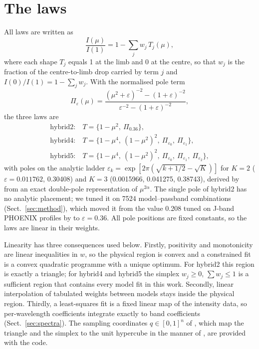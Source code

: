 \documentclass{aa}
\begin{document}
\section{The laws}\label{sec:laws}
All laws are written as
\begin{equation}
\frac{I(\mu)}{I(1)}=1-\sum_j w_j\,T_j(\mu),
\end{equation}
where each shape $T_j$ equals 1 at the limb and 0 at the centre, so that $w_j$
is the fraction of the centre-to-limb drop carried by term $j$ and
$I(0)/I(1)=1-\sum_j w_j$. With the normalised pole term
\begin{equation}
\Pi_\varepsilon(\mu)=\frac{(\mu^2+\varepsilon)^{-2}-(1+\varepsilon)^{-2}}{\varepsilon^{-2}-(1+\varepsilon)^{-2}},
\end{equation}
the three laws are
\begin{align}
\text{hybrid2:}\ & T=\{1-\mu^2,\ \Pi_{0.36}\},\\
\text{hybrid4:}\ & T=\{1-\mu^4,\ (1-\mu^2)^2,\ \Pi_{\varepsilon_0},\ \Pi_{\varepsilon_1}\},\\
\text{hybrid5:}\ & T=\{1-\mu^4,\ (1-\mu^2)^2,\ \Pi_{\varepsilon_0},\ \Pi_{\varepsilon_1},\ \Pi_{\varepsilon_2}\},
\end{align}
with poles on the analytic ladder
$\varepsilon_k=\exp[2\pi(\sqrt{k+1/2}-\sqrt K)]$ for $K=2$
($\varepsilon=0.011762$, 0.30408) and $K=3$ (0.0015966, 0.041275, 0.38743),
derived by \citet{squishier} from an exact double-pole representation of
$\mu^{2\alpha}$. The single pole of hybrid2 has no analytic placement; we tuned
it on 7524 model--passband combinations (Sect.~\ref{sec:method}), which moved
it from the value 0.208 tuned on J-band PHOENIX profiles by \citet{squishier}
to $\varepsilon=0.36$. All pole positions are fixed constants, so the laws are
linear in their weights.

Linearity has three consequences used below. Firstly, positivity and
monotonicity are linear inequalities in $w$, so the physical region is convex
and a constrained fit is a convex quadratic programme with a unique optimum. For
hybrid2 this region is exactly a triangle; for hybrid4 and hybrid5 the simplex
$w_j\ge0$, $\sum w_j\le1$ is a sufficient region that contains every model fit
in this work. Secondly, linear interpolation of tabulated weights between
models stays inside the physical region. Thirdly, a least-squares fit is a fixed
linear map of the intensity data, so per-wavelength coefficients integrate
exactly to band coefficients (Sect.~\ref{sec:spectra}). The sampling coordinates
$q\in[0,1]^n$ of \citet{squishier}, which map the triangle and the simplex to
the unit hypercube in the manner of \citet{kipping2013}, are provided with the
code.
\end{document}
